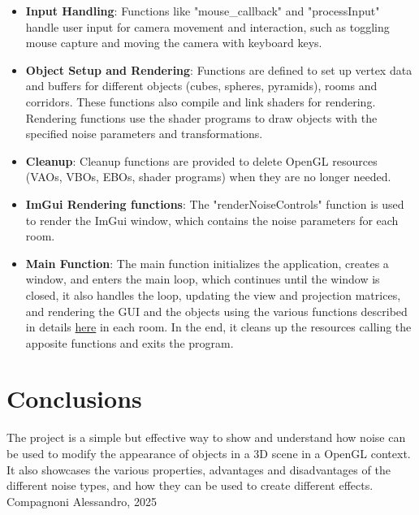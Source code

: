 \documentclass[12pt]{article}
\begin{document}
\begin{enumerate}
\begin{itemize}
    \item \textbf{Input Handling}:
    \newline
    Functions like "mouse\_callback" and "processInput" handle user input for camera movement and interaction, such as toggling mouse capture and moving the camera with keyboard keys.

    \item \textbf{Object Setup and Rendering}:
    \newline
    Functions are defined to set up vertex data and buffers for different objects (cubes, spheres, pyramids), rooms and corridors. These functions also compile and link shaders for rendering.
    Rendering functions use the shader programs to draw objects with the specified noise parameters and transformations.

    \item \textbf{Cleanup}:
    \newline
    Cleanup functions are provided to delete OpenGL resources (VAOs, VBOs, EBOs, shader programs) when they are no longer needed.

    \item \textbf{ImGui Rendering functions}:
    \newline
    The "renderNoiseControls" function is used to render the ImGui window, which contains the noise parameters for each room.

    \item \textbf{Main Function}:
    \newline
    The main function initializes the application, creates a window, and enters the main loop, which continues until the window is closed, it also handles the loop, updating the view and projection matrices, and rendering the GUI and the 	    objects using the various functions described in details \hyperref[sec:noiseGeneration]{here} in each room.
    In the end, it cleans up the resources calling the apposite functions and exits the program.
\end{itemize}
\end{enumerate}

\section{Conclusions}
\label{sec:conclusions}
The project is a simple but effective way to show and understand how noise can be used to modify the appearance of objects in a 3D scene in a OpenGL context.
It also showcases the various properties, advantages and disadvantages of the different noise types, and how they can be used to create different effects.
\newline
Compagnoni Alessandro, 2025
\end{document}
